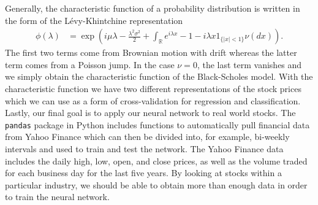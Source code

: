 \documentclass[10pt]{article}
\begin{document}
Generally, the characteristic function of a probability distribution is written in the form of the L\'{e}vy-Khintchine representation
\begin{align*}
\phi(\lambda) &= \exp \left(i \mu \lambda - \frac{\lambda^2 \sigma^2}{2} + \int_\mathbb{R} e^{i \lambda x} - 1 - i \lambda x 1_{\{ |x| < 1 \}} \nu(dx) \right).
\end{align*}
The first two terms come from Brownian motion with drift whereas the latter term comes from a Poisson jump. In the case $\nu = 0$, the last term vanishes and we simply obtain the characteristic function of the Black-Scholes model. With the characteristic function we have two different representations of the stock prices which we can use as a form of cross-validation for regression and classification. \\

Lastly, our final goal is to apply our neural network to real world stocks. The \texttt{pandas} package in Python includes functions to automatically pull financial data from Yahoo Finance which can then be divided into, for example, bi-weekly intervals and used to train and test the network. The Yahoo Finance data includes the daily high, low, open, and close prices, as well as the volume traded for each business day for the last five years. By looking at stocks within a particular industry, we should be able to obtain more than enough data in order to train the neural network. 
\end{document}
